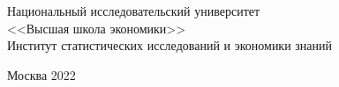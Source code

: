 \begingroup
\thispagestyle{empty}
\singlespace
\begin{center}
    Национальный исследовательский университет \\
    <<Высшая школа экономики>> \\
    Институт статистических исследований и экономики знаний
    \vfill
    {\Huge \myTitle}
    \vspace{7mm}

    {\large \mySubtitle}
    \vfill
    \vfill
    Москва 2022
\end{center}
\endgroup
